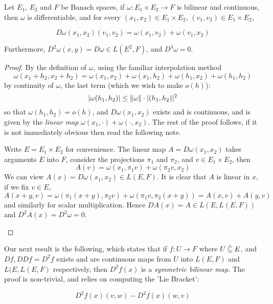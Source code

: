 \documentclass[../main-manifolds.tex]{subfiles}
\begin{document}
\begin{wts}
    Let $E_1$, $E_2$ and $F$ be Banach spaces, if $\omega: E_1\times E_2\to F$ is bilinear and continuous, then $\omega$ is differentiable, and for every $(x_1, x_2)\in E_1\times E_2$, $(v_1,v_2)\in E_1\times E_2$,

    \[
        D\omega(x_1,x_2)(v_1,v_2) = \omega(x_1, v_2) + \omega(v_1, x_2)
    \]

    Furthermore, $D^2\omega(x,y) = D\omega\in L(E^2,F)$, and $D^3\omega = 0$.
    
\end{wts}
\begin{proof}
    By the definition of $\omega$, using the familiar interpolation method
    \[
        \omega(x_1 + h_2, x_2 + h_2) = \omega(x_1, x_2)  + \omega(x_1, h_2) + \omega(h_1, x_2) + \omega(h_1, h_2)
    \]
    by continuity of $\omega$, the last term (which we wish to make $o(h)$): 
    \[
    \vert \omega(h_1, h_2)\vert\leq \norm{\omega}\cdot\vert (h_1, h_2)\vert^2
    \]
    so that $\omega(h_1, h_2) = o(h)$, and $D\omega(x_1, x_2)$ exists and is continuous, and is given by the \emph{linear map} $\omega(x_1, \cdot) + \omega(\cdot, x_2)$. The rest of the proof follows, if it is not immediately obvious then read the following note.
    \begin{note}
        Write $E = E_1\times E_2$ for convenience. The linear map $A = D\omega(x_1, x_2)$ takes arguments $E$ into $F$, consider the projections $\pi_1$ and $\pi_2$, and $v\in E_1\times E_2$, then
        \[A(v) = \omega(x_1, \pi_1 v) + \omega(\pi_2 v, x_2)\]
        We can view $A(x) = D\omega(x_1, x_2)\in L(E,F)$. It is clear that $A$ is linear in $x$, if we fix $v\in E$, 
        \[
            A(x+y, v) = \omega(\pi_1(x+y), \pi_2 v) + \omega(\pi_1 v, \pi_2 (x+y)) = A(x,v) + A(y,v)
        \]
        and similarly for scalar multiplication. Hence $DA(x) = A\in L(E, L(E,F))$ and $D^2A(x) = D^3\omega = 0$.
    \end{note}
\end{proof}

Our next result is the following, which states that if $f: U\to F$ where $U\:\mathring{\subseteq}\: E$, and $Df, DDf = D^2f$ exists and are continuous maps from $U$ into $L(E,F)$ and $L(E,L(E,F)$ respectively, then $D^2f(x)$ is a \emph{symmetric bilinear map}. The proof is non-trivial, and relies on computing the 'Lie Bracket':

\[
    D^2f(x)(v,w) - D^2f(x)(w,v)
\]
\end{document}
